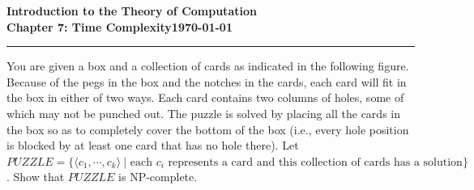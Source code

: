 \documentclass[11pt]{article}
\newcommand{\dated}{\today}
\begin{document}
\textbf{Introduction to the Theory of
Computation}\hfill\textbf{\myname}\\[0.01in]
\textbf{Chapter 7: Time Complexity}\hfill\textbf{\dated}\\
\smallskip\hrule\bigskip

\begin{problem}{7.28}
You are given a box and a collection of cards as indicated in the following figure.
Because of the pegs in the box and the notches in the cards, each card will fit in the
box in either of two ways. Each card contains two columns of holes, some of which
may not be punched out. The puzzle is solved by placing all the cards in the box
so as to completely cover the bottom of the box (i.e., every hole position is blocked
by at least one card that has no hole there). Let $PUZZLE = \{\langle c_1, \cdots, c_k \rangle \ | \text{ each } c_i \text{ represents a card and this collection of cards has a solution}\}$. Show that $PUZZLE$ is NP-complete.
\end{problem}
\end{document}
